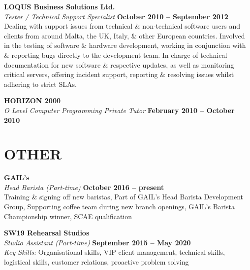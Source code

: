 \documentclass[margin,line]{resume}
\begin{document}
\begin{resume}
    \textbf{\listing LOQUS Business Solutions Ltd.} \vspace{2mm}\\\vspace{1mm}%
    \textsl{Tester / Technical Support Specialist} \hfill \textbf{October 2010 -- September 2012}\\
Dealing with support issues from technical \& non-technical software users and clients from around Malta, the UK, Italy, \& other European countries. Involved in the testing of software \& hardware development, working in conjunction with \& reporting bugs directly to the development team. In charge of technical documentation for new software \& respective updates, as well as monitoring critical servers, offering incident support, reporting \& resolving issues whilst adhering to strict SLAs. 

    \textbf{\listing HORIZON 2000} \vspace{2mm}\\ %
    \textsl{O Level Computer Programming Private Tutor} \hfill \textbf{February 2010 -- October 2010}%
    \section{\mysidestyle \textbf{\large{O}\small{THER}}}
    \textbf{\listing GAIL's} \vspace{2mm}\\\vspace{1mm}%
    \textsl{Head Barista (Part-time)} \hfill \textbf{October 2016 -- present }\\
Training \& signing off new baristas, Part of GAIL's Head Barista Development Group, Supporting coffee team during new branch openings, GAIL’s Barista Championship winner, SCAE qualification

    \textbf{\listing SW19 Rehearsal Studios} \vspace{2mm}\\\vspace{1mm}%
    \textsl{Studio Assistant (Part-time)} \hfill \textbf{September 2015 -- May 2020}\\
     \textsl{Key Skills:} Organisational skills, VIP client management,  technical skills, logistical skills, customer relations, proactive problem solving


\end{resume}
\end{document}
